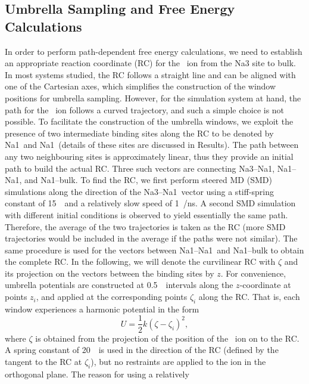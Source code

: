 \subsection{Umbrella Sampling and Free Energy Calculations}
In order to perform path-dependent free energy calculations, we need to 
establish an appropriate reaction coordinate (RC) for the \Na\ ion from the Na3 
site to bulk. In most systems studied, the RC follows a straight line and can be 
aligned with one of the Cartesian axes, which simplifies the construction of 
the window positions for umbrella sampling. However, for the simulation system 
at hand, the path for the \Na\ ion follows a curved trajectory, and such a 
simple choice is not possible. To facilitate the construction of the umbrella 
windows, we exploit the presence of two intermediate binding sites along the RC to 
be denoted by Na1\prim\ and Na1\dprim\ (details of these sites are discussed in 
Results). The path between any two neighbouring sites is approximately linear, 
thus they provide an initial path to build the actual RC. Three such vectors are 
connecting Na3--Na1\prim, Na1\prim--Na1\dprim, and Na1\dprim--bulk. To 
find the RC, we first perform steered MD (SMD) simulations along the direction 
of the Na3--Na1\prim\ vector using a stiff-spring constant of 15~\spring\ and a 
relatively slow speed of 1~\angs/ns. A second SMD simulation with different 
initial 
conditions is observed to yield essentially the same path. Therefore, the 
average 
of the two trajectories is taken as the RC (more SMD trajectories would be 
included in the average if the paths were not similar).  The same procedure is 
used for the vectors between Na1\prim--Na1\dprim\ and Na1\dprim--bulk to obtain 
the complete RC. In the following, we will denote the curvilinear RC with 
$\zeta$ and its projection on the vectors between the binding sites by $z$. For 
convenience, umbrella potentials are constructed at 0.5~\angs\ intervals along the 
$z$-coordinate at points $z_i$, and applied at the corresponding points 
$\zeta_i$ along the RC. That is, each window experiences a harmonic potential in 
the form
\begin{equation}
 U = \frac{1}{2} k(\zeta - \zeta_i)^2,
 \label{na3:eq1}
\end{equation}
where $\zeta$ is obtained from the projection of the position of the \Na\ ion 
on to the RC.  A spring constant of 20~\spring\ is used in the direction of the 
RC (defined by the tangent to the RC at $\zeta_i$), but no restraints are 
applied to the ion in the orthogonal plane. The reason for using a relatively 
